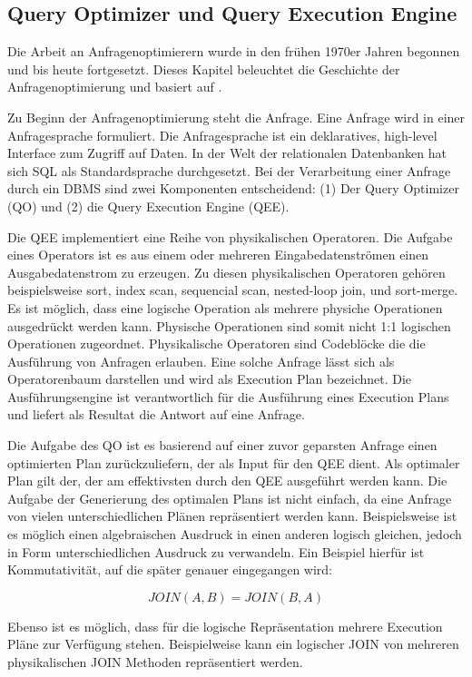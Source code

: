 

\subsection{Query Optimizer und Query Execution Engine}
Die Arbeit an Anfragenoptimierern wurde in den frühen 1970er Jahren begonnen und bis heute fortgesetzt. Dieses Kapitel beleuchtet die Geschichte der Anfragenoptimierung und basiert auf \cite{chaudhuri1998overview}.


Zu Beginn der Anfragenoptimierung steht die Anfrage. Eine Anfrage wird in einer Anfragesprache formuliert. Die Anfragesprache ist ein deklaratives, high-level Interface zum Zugriff auf Daten. In der Welt der relationalen Datenbanken hat sich SQL als Standardsprache durchgesetzt. Bei der Verarbeitung einer Anfrage durch ein DBMS sind zwei Komponenten entscheidend: (1) Der Query Optimizer  (QO) und (2) die Query Execution Engine (QEE).

Die QEE implementiert eine Reihe von physikalischen Operatoren. Die Aufgabe eines Operators ist es aus einem oder mehreren Eingabedatenströmen einen Ausgabedatenstrom zu erzeugen. Zu diesen physikalischen Operatoren gehören beispielsweise sort, index scan, sequencial scan, nested-loop join, und sort-merge. Es ist möglich, dass eine logische Operation als mehrere physiche Operationen ausgedrückt werden kann. Physische Operationen sind somit nicht 1:1 logischen Operationen zugeordnet. Physikalische Operatoren sind Codeblöcke die die Ausführung von Anfragen erlauben. Eine solche Anfrage lässt sich als Operatorenbaum darstellen und wird als Execution Plan bezeichnet. Die Ausführungsengine ist verantwortlich für die Ausführung eines Execution Plans und liefert als Resultat die Antwort auf eine Anfrage.

Die Aufgabe des QO ist es basierend auf einer zuvor geparsten Anfrage einen optimierten Plan zurückzuliefern, der als Input für den QEE dient. Als optimaler Plan gilt der, der am effektivsten durch den QEE ausgeführt werden kann. Die Aufgabe der Generierung des optimalen Plans ist nicht einfach, da eine Anfrage von vielen unterschiedlichen Plänen repräsentiert werden kann. Beispielsweise ist es möglich einen algebraischen Ausdruck in einen anderen logisch gleichen, jedoch in Form unterschiedlichen Ausdruck zu verwandeln. Ein Beispiel hierfür ist Kommutativität, auf die später genauer eingegangen wird:

$$ JOIN(A,B) = JOIN(B,A)$$

Ebenso ist es möglich, dass für die logische Repräsentation mehrere Execution Pläne zur Verfügung stehen. Beispielweise kann ein logischer JOIN von mehreren physikalischen JOIN Methoden repräsentiert werden.

